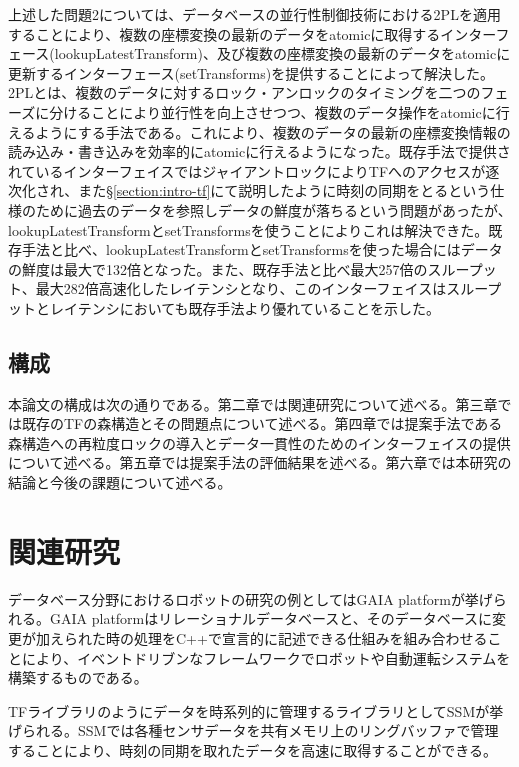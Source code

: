 \documentclass[a4paper]{jreport}	%
\begin{document}
上述した問題2については、データベースの並行性制御技術における2PLを適用することにより、複数の座標変換の最新のデータをatomicに取得するインターフェース(lookupLatestTransform)、及び複数の座標変換の最新のデータをatomicに更新するインターフェース(setTransforms)を提供することによって解決した。2PLとは、複数のデータに対するロック・アンロックのタイミングを二つのフェーズに分けることにより並行性を向上させつつ、複数のデータ操作をatomicに行えるようにする手法である。これにより、複数のデータの最新の座標変換情報の読み込み・書き込みを効率的にatomicに行えるようになった。既存手法で提供されているインターフェイスではジャイアントロックによりTFへのアクセスが逐次化され、また§\ref{section:intro-tf}にて説明したように時刻の同期をとるという仕様のために過去のデータを参照しデータの鮮度が落ちるという問題があったが、lookupLatestTransformとsetTransformsを使うことによりこれは解決できた。既存手法と比べ、lookupLatestTransformとsetTransformsを使った場合にはデータの鮮度は最大で132倍となった。また、既存手法と比べ最大257倍のスループット、最大282倍高速化したレイテンシとなり、このインターフェイスはスループットとレイテンシにおいても既存手法より優れていることを示した。

\section{構成}
本論文の構成は次の通りである。第二章では関連研究について述べる。第三章では既存のTFの森構造とその問題点について述べる。第四章では提案手法である森構造への再粒度ロックの導入とデータ一貫性のためのインターフェイスの提供について述べる。第五章では提案手法の評価結果を述べる。第六章では本研究の結論と今後の課題について述べる。

\chapter{関連研究}

データベース分野におけるロボットの研究の例としてはGAIA platform\cite{gaia}が挙げられる。GAIA platformはリレーショナルデータベースと、そのデータベースに変更が加えられた時の処理をC++で宣言的に記述できる仕組みを組み合わせることにより、イベントドリブンなフレームワークでロボットや自動運転システムを構築するものである。

TFライブラリのようにデータを時系列的に管理するライブラリとしてSSMが挙げられる。SSMでは各種センサデータを共有メモリ上のリングバッファで管理することにより、時刻の同期を取れたデータを高速に取得することができる。
\end{document}
